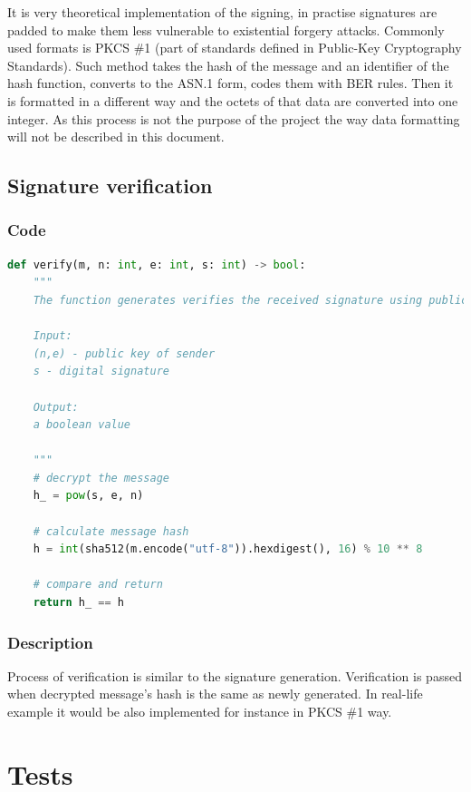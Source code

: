 \documentclass{article}
\begin{document}
It is very theoretical implementation of the signing, in practise signatures are padded
to make them less vulnerable to existential forgery attacks. Commonly used formats is PKCS \#1 (part
of standards defined in Public-Key Cryptography Standards). Such method takes the hash of the message and an
identifier of the hash function, converts to the ASN.1 form, codes them with BER rules. Then
it is formatted in a different way and the octets of that data are converted into one integer.
As this process is not the purpose of the project the way data formatting will not be described
in this document.

\subsection{Signature verification}
\subsubsection{Code}

\small

\begin{lstlisting}[language=Python]
    def verify(m, n: int, e: int, s: int) -> bool:
    """
    The function generates verifies the received signature using public key.

    Input:
    (n,e) - public key of sender
    s - digital signature

    Output:
    a boolean value

    """
    # decrypt the message
    h_ = pow(s, e, n)

    # calculate message hash
    h = int(sha512(m.encode("utf-8")).hexdigest(), 16) % 10 ** 8

    # compare and return
    return h_ == h    
\end{lstlisting}

\normalsize

\subsubsection{Description}
Process of verification is similar to the signature generation. Verification is passed when
decrypted message's hash is the same as newly generated. In real-life example it would be also
implemented for instance in PKCS \#1 way.

\section{Tests}
\end{document}
